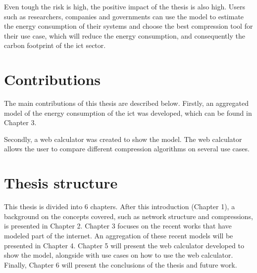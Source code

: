 Even tough the risk is high, the positive impact of the thesis is also high. Users such as researchers, companies and governments can use the model to estimate the energy consumption of their systems and choose the best compression tool for their use case, which will reduce the energy consumption, and consequently the carbon footprint of the \ac{ict} sector.

\section{Contributions}

The main contributions of this thesis are described below.
Firstly, an aggregated model of the energy consumption of the \ac{ict} was developed, which can be found in Chapter 3.%

Secondly, a web calculator was created to show the model. The web calculator allows the user to compare different compression algorithms on several use cases.%



\section{Thesis structure}

This thesis is divided into 6 chapters. After this introduction (Chapter 1), a background on the concepts covered, such as network structure and compressions, is presented in Chapter 2. 
Chapter 3 focuses on the recent works that have modeled part of the internet. 
An aggregation of these recent models will be presented in Chapter 4. 
Chapter 5 will present the web calculator developed to show the model, alongside with use cases on how to use the web calculator. 
Finally, Chapter 6 will present the conclusions of the thesis and future work.


